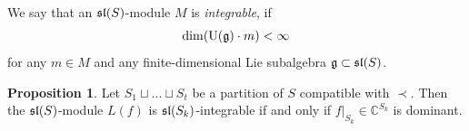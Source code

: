 \documentclass[10pt]{amsart}\oddsidemargin -1mm \evensidemargin -1mm \topmargin -15mm\headheight5mm \headsep 3.5mm \textheight 245mm\textwidth 170mm %
\theoremstyle{definition}\newtheorem{theorem}{Theorem}[section]\newtheorem{lemma}[theorem]{Lemma}\newtheorem{remark}[theorem]{Remark}\newtheorem{proposition}[theorem]{Proposition}\newtheorem{corollary}[theorem]{Corollary}\newtheorem{definition}[theorem]{Definition}\newtheorem{Ex}[theorem]{Example}
\begin{document}
We say that an $\frak{sl}(S)$-module $M$ is {\it integrable}, if
$$\dim (\operatorname{\mathrm{U}}(\frak g)\cdot m)<\infty$$for any $m\in M$ and any
finite-dimensional Lie subalgebra $\frak g\subset\frak{sl}(S)$.
\begin{proposition}\label{Ldom-} Let $S_1\sqcup ...\sqcup S_t$ be a partition of $S$ compatible with $\prec$. Then the $\frak{sl}(S)$-module $L(f)$ is $\frak{sl}(S_k)$-integrable if and only if
$f|_{S_k}\in \mathbb C^{S_k}$ is dominant.\end{proposition}




\end{document}
